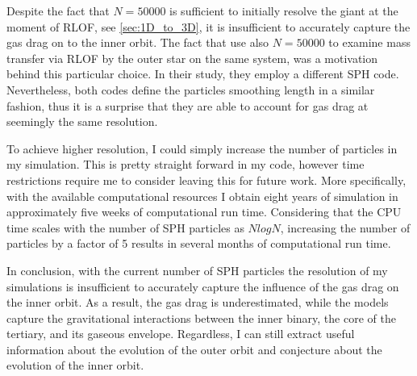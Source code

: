 Despite the fact that $N=50000$ is sufficient to initially resolve the giant at the moment of RLOF, see \cref{sec:1D_to_3D}, it is insufficient to accurately capture the gas drag on to the inner orbit. The fact that \cite{de2014evolution} use also $N=50000$ to examine mass transfer via RLOF by the outer star on the same system, was a motivation behind this particular choice. In their study, they employ a different SPH code. Nevertheless, both codes define the particles smoothing length in a similar fashion, thus it is a surprise that they are able to account for gas drag at seemingly the same resolution. 

To achieve higher resolution, I could simply increase the number of particles in my simulation. This is pretty straight forward in my code, however time restrictions require me to consider leaving this for future work. More specifically, with the available computational resources I obtain eight years of simulation in approximately five weeks of computational run time. Considering that the CPU time scales with the number of SPH particles as $NlogN$, increasing the number of particles by a factor of 5  results in several months of computational run time. 

In conclusion, with the current number of SPH particles the resolution of my simulations is insufficient to accurately capture the influence of the gas drag on the inner orbit. As a result, the gas drag is underestimated, while the models capture the gravitational interactions between the inner binary, the core of the tertiary, and its gaseous envelope. Regardless, I can still extract useful information about the evolution of the outer orbit and conjecture about the evolution of the inner orbit. 
